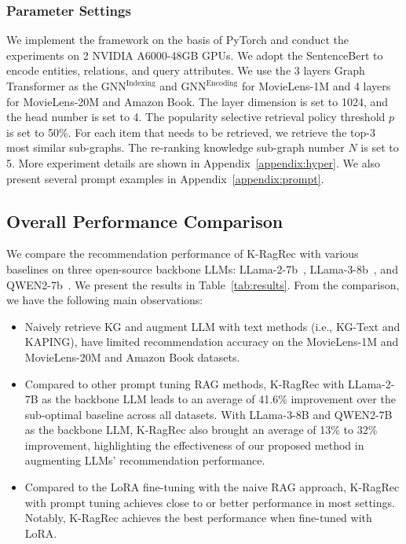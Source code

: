 



\subsubsection{Parameter Settings}
We implement the framework on the basis of PyTorch and conduct the experiments on 2 NVIDIA A6000-48GB GPUs. We adopt the SentenceBert to encode entities, relations, and query attributes. 
We use the 3 layers Graph Transformer as the $\text{GNN}^{\text{Indexing}}$ and $\text{GNN}^{\text{Encoding}}$ for MovieLens-1M and 4 layers for MovieLens-20M and Amazon Book. The layer dimension is set to 1024, and the head number is set to 4. 
The popularity selective retrieval policy threshold $p$ is set to 50\%.
For each item that needs to be retrieved, we retrieve the top-3 most similar sub-graphs. The re-ranking knowledge sub-graph number $N$ is set to 5. More experiment details are shown in Appendix~\ref{appendix:hyper}. We also present
several prompt examples in Appendix~\ref{appendix:prompt}.





\subsection{\textbf{Overall Performance Comparison}}
We compare the recommendation performance of K-RagRec with various baselines on three open-source backbone LLMs: LLama-2-7b~\citep{touvron2023llama}, LLama-3-8b~\citep{dubey2024llama}, and QWEN2-7b~\citep{yang2024qwen2}. We present the results in Table~\ref{tab:results}. From the comparison, we have the following main observations:
\vspace{-0.1in}
 \begin{itemize} [leftmargin=*] 
\setlength{\itemsep}{0pt}
\setlength{\parsep}{0pt}
\setlength{\parskip}{0pt}
\item Naively retrieve KG and augment LLM with text methods (i.e., KG-Text and KAPING),  have limited recommendation accuracy on the MovieLens-1M and MovieLens-20M and Amazon Book datasets.

\item Compared to other prompt tuning RAG methods, K-RagRec with LLama-2-7B as the backbone LLM leads to an average of 41.6\% improvement over the sub-optimal baseline across all datasets. With LLama-3-8B and QWEN2-7B as the backbone LLM, K-RagRec also brought an average of 13\% to 32\% improvement, highlighting the effectiveness of our proposed method in augmenting LLMs' recommendation performance.

\item Compared to the LoRA fine-tuning with the naive RAG approach, K-RagRec with prompt tuning achieves close to or better performance in most settings. Notably, K-RagRec achieves the best performance when fine-tuned with LoRA.
\end{itemize}



